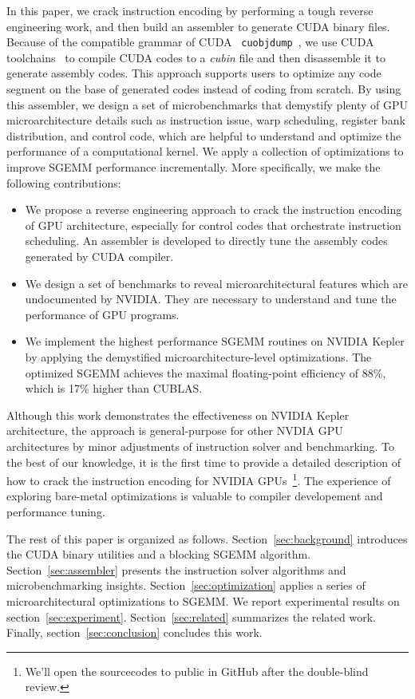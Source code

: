In this paper, we crack instruction encoding by performing a tough reverse engineering work, and then build an 
assembler to generate CUDA binary files. Because of the compatible grammar of CUDA {\tt 
cuobjdump}~\cite{cubin2015util}, we use CUDA toolchains~\cite{nvcc} to compile CUDA codes to a {\em cubin} file and 
then disassemble it to generate assembly codes. This approach supports users to optimize any code segment on the base 
of generated codes instead of coding from scratch. By using this assembler, we design a set of microbenchmarks that 
demystify plenty of GPU microarchitecture details such as instruction issue, warp scheduling, register bank distribution, 
and control code, which are helpful to understand and optimize the performance of a computational kernel. We apply a collection of 
optimizations to improve SGEMM performance incrementally. More specifically, we make the following contributions:
\begin{itemize}
\item We propose a reverse engineering approach to crack the instruction encoding of GPU architecture, especially for 
control codes that orchestrate instruction scheduling. An assembler is developed to directly tune the assembly codes 
generated by CUDA compiler.
\item We design a set of benchmarks to reveal microarchitectural features which are undocumented by NVIDIA. They are 
necessary to understand and tune the performance of GPU programs.
\item We implement the highest performance SGEMM routines on NVIDIA Kepler by applying the demystified 
microarchitecture-level optimizations. The optimized SGEMM achieves the maximal floating-point efficiency of 88\%, 
which is 17\% higher than CUBLAS.
\end{itemize}

Although this work demonstrates the effectiveness on NVIDIA Kepler architecture, the approach is general-purpose for 
other NVDIA GPU architectures by minor adjustments of instruction solver and benchmarking. To the best of our 
knowledge, it is the first time to provide a detailed description of how to crack the instruction encoding for NVIDIA 
GPUs~\footnote{We'll open the sourcecodes to public in GitHub after the double-blind review.}. The experience of 
exploring bare-metal optimizations is valuable to compiler developement and performance tuning.

The rest of this paper is organized as follows. Section~\ref{sec:background} introduces the CUDA binary utilities and a 
blocking SGEMM algorithm. Section~\ref{sec:assembler} presents the instruction solver algorithms and microbenchmarking 
insights. Section~\ref{sec:optimization} applies a series of microarchitectural optimizations to SGEMM. We report 
experimental results on section~\ref{sec:experiment}. Section~\ref{sec:related} summarizes the related work. Finally, 
section~\ref{sec:conclusion} concludes this work. 
